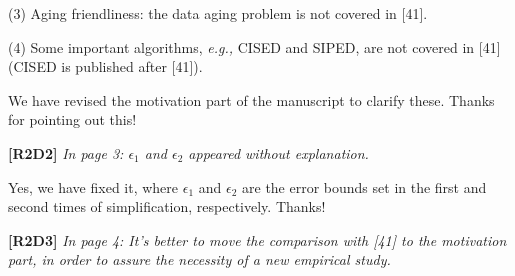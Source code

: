 \documentclass{letter}
\newcommand{\eg}{\emph{e.g.,}\xspace}
\newcommand{\wrt}{\emph{w.r.t.}\xspace}
\begin{document}
(3) Aging friendliness: the data aging problem is not covered in [41].

(4) Some important algorithms, \eg CISED and SIPED, are not covered in [41] (CISED is published after [41]).

We have revised the motivation part of the manuscript to clarify these.
Thanks for pointing out this!



\textbf{[R2D2]} \emph{In page 3: $\epsilon_1$ and $\epsilon_2$ appeared without explanation.}

Yes, we have fixed it, {where $\epsilon_1$ and $\epsilon_2$ are the error bounds set in the first and second times of simplification, respectively}.
Thanks!

\textbf{[R2D3]} \emph{ In page 4: It's better to move the comparison with [41] to the motivation part, in order to assure the necessity of a new empirical study.}
\end{document}
